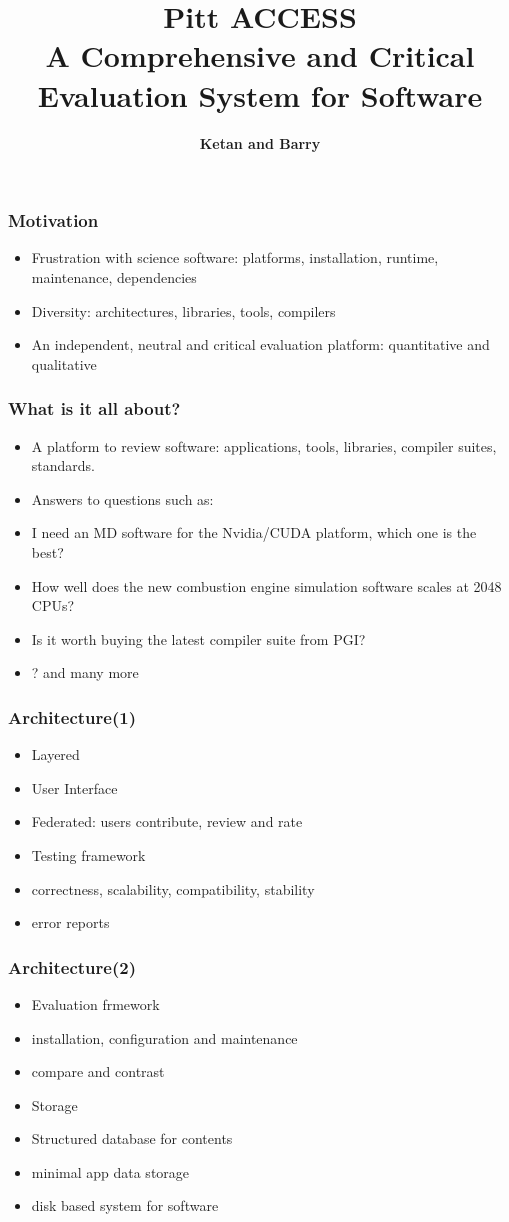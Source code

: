 \documentclass[hyperref={pdfpagelabels=false},12pt]{beamer}
\title[Pitt Access]{{\large Pitt ACCESS\\ A Comprehensive and Critical Evaluation System for Software}}
\author[Pitt-Access]{{\scriptsize \textbf{Ketan and Barry}}}
\date{}
\begin{document}
\begin{frame}[plain]
\titlepage
\end{frame}

\begin{frame}
\frametitle{Motivation}
\begin{itemize}
\itemsep1em
\item 
Frustration with science software: platforms, installation, runtime, maintenance, dependencies
\item 
Diversity: architectures, libraries, tools, compilers
\item 
An independent, neutral and critical evaluation platform: quantitative and qualitative
\end{itemize}
\end{frame}

\begin{frame}
\frametitle{What is it all about?}
\begin{itemize}
\itemsep1em
\item 
A platform to review software: applications, tools, libraries, compiler suites, standards.
\item 
Answers to questions such as:
\item 
I need an MD software for the Nvidia/CUDA platform, which one is the best?
\item 
How well does the new combustion engine simulation software scales at 2048 CPUs?
\item 
Is it worth buying the latest compiler suite from PGI?
\item 
? and many more
\end{itemize}

\end{frame}

\begin{frame}
\frametitle{Architecture(1)}
\begin{itemize}
\itemsep1em
\item 
Layered
\item 
User Interface
\item
Federated: users contribute, review and rate
\item
Testing framework
\item
correctness, scalability, compatibility, stability
\item
error reports
\end{itemize}
\end{frame}

\begin{frame}
\frametitle{Architecture(2)}
\begin{itemize}
\itemsep1em
\item Evaluation frmework
\item
installation, configuration and maintenance
\item
compare and contrast
\item
Storage
\item
Structured database for contents
\item
minimal app data storage
\item
disk based system for software
\end{itemize}
\end{frame}
\end{document}
